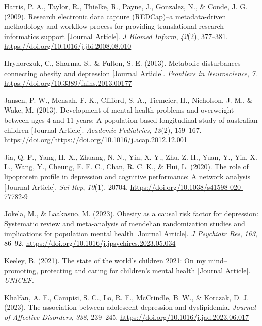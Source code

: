 \documentclass[
  letterpaper,
  DIV=11,
  numbers=noendperiod]{scrreport}
\newlength{\cslhangindent}
\newenvironment{CSLReferences}[2] %
 {\begin{list}{}{%
  \setlength{\itemindent}{0pt}
  \setlength{\leftmargin}{0pt}
  \setlength{\parsep}{0pt}
  \ifodd #1
   \setlength{\leftmargin}{\cslhangindent}
   \setlength{\itemindent}{-1\cslhangindent}
  \fi
  \setlength{\itemsep}{#2\baselineskip}}}
 {\end{list}}
\begin{document}
\begin{CSLReferences}{1}{0}
Harris, P. A., Taylor, R., Thielke, R., Payne, J., Gonzalez, N., \&
Conde, J. G. (2009). Research electronic data capture (REDCap)--a
metadata-driven methodology and workflow process for providing
translational research informatics support {[}Journal Article{]}.
\emph{J Biomed Inform}, \emph{42}(2), 377--381.
\url{https://doi.org/10.1016/j.jbi.2008.08.010}

Hryhorczuk, C., Sharma, S., \& Fulton, S. E. (2013). Metabolic
disturbances connecting obesity and depression {[}Journal Article{]}.
\emph{Frontiers in Neuroscience}, \emph{7}.
\url{https://doi.org/10.3389/fnins.2013.00177}

Jansen, P. W., Mensah, F. K., Clifford, S. A., Tiemeier, H., Nicholson,
J. M., \& Wake, M. (2013). Development of mental health problems and
overweight between ages 4 and 11 years: A population-based longitudinal
study of australian children {[}Journal Article{]}. \emph{Academic
Pediatrics}, \emph{13}(2), 159--167.
https://doi.org/\url{https://doi.org/10.1016/j.acap.2012.12.001}

Jia, Q. F., Yang, H. X., Zhuang, N. N., Yin, X. Y., Zhu, Z. H., Yuan,
Y., Yin, X. L., Wang, Y., Cheung, E. F. C., Chan, R. C. K., \& Hui, L.
(2020). The role of lipoprotein profile in depression and cognitive
performance: A network analysis {[}Journal Article{]}. \emph{Sci Rep},
\emph{10}(1), 20704. \url{https://doi.org/10.1038/s41598-020-77782-9}

Jokela, M., \& Laakasuo, M. (2023). Obesity as a causal risk factor for
depression: Systematic review and meta-analysis of mendelian
randomization studies and implications for population mental health
{[}Journal Article{]}. \emph{J Psychiatr Res}, \emph{163}, 86--92.
\url{https://doi.org/10.1016/j.jpsychires.2023.05.034}

Keeley, B. (2021). The state of the world's children 2021: On my
mind--promoting, protecting and caring for children's mental health
{[}Journal Article{]}. \emph{UNICEF}.

Khalfan, A. F., Campisi, S. C., Lo, R. F., McCrindle, B. W., \& Korczak,
D. J. (2023). The association between adolescent depression and
dyslipidemia. \emph{Journal of Affective Disorders}, \emph{338},
239--245. \url{https://doi.org/10.1016/j.jad.2023.06.017}


\end{CSLReferences}
\end{document}
